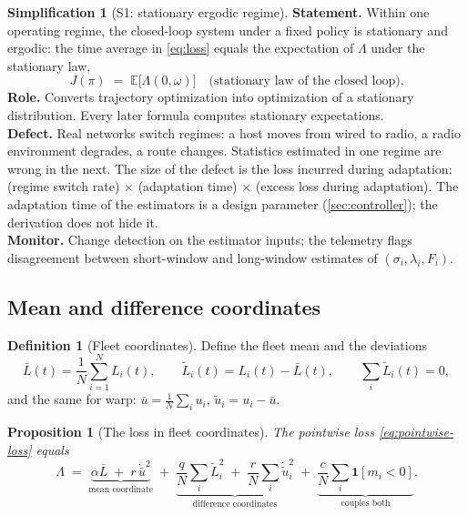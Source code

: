 \documentclass[11pt, a4paper]{article}
\theoremstyle{definition}
\newtheorem{definition}{Definition}[section]
\newtheorem{simplification}{Simplification}
\theoremstyle{plain}
\newtheorem{proposition}[theorem]{Proposition}
\theoremstyle{remark}
\newcommand{\E}{\mathbb{E}}
\newcommand{\ind}[1]{\mathbf{1}\!\left[#1\right]}
\newcommand{\Lbar}{\bar{L}}
\newcommand{\Ltil}[1]{\tilde{L}_{#1}}
\begin{document}
\begin{simplification}[S1: stationary ergodic regime]\label{simp:ergodic}
\textbf{Statement.}  Within one operating regime, the closed-loop system
under a fixed policy is stationary and ergodic: the time average in
\cref{eq:loss} equals the expectation of $\Lambda$ under the stationary law,
\[
  J(\pi) \;=\; \E\bigl[\Lambda(0,\omega)\bigr]
  \quad\text{(stationary law of the closed loop).}
\]
\textbf{Role.}  Converts trajectory optimization into optimization of a
stationary distribution.  Every later formula computes stationary
expectations.\\
\textbf{Defect.}  Real networks switch regimes: a host moves from wired
to radio, a radio environment degrades, a route changes.  Statistics
estimated in one regime are wrong in the next.  The size of the defect is
the loss incurred during adaptation: (regime switch rate) $\times$
(adaptation time) $\times$ (excess loss during adaptation).  The
adaptation time of the estimators is a design parameter
(\cref{sec:controller}); the derivation does not hide it.\\
\textbf{Monitor.}  Change detection on the estimator inputs; the
telemetry flags disagreement between short-window and long-window
estimates of $(\sigma_i, \lambda_i, F_i)$.
\end{simplification}

\subsection{Mean and difference coordinates}\label{sec:coordinates}

\begin{definition}[Fleet coordinates]\label{def:coordinates}
Define the fleet mean and the deviations
\[
  \Lbar(t) = \frac1N\sum_{i=1}^N L_i(t),
  \qquad
  \Ltil{i}(t) = L_i(t) - \Lbar(t),
  \qquad
  \textstyle\sum_i \Ltil{i}(t) = 0 ,
\]
and the same for warp: $\bar u = \frac1N\sum_i u_i$,
$\tilde u_i = u_i - \bar u$.
\end{definition}

\begin{proposition}[The loss in fleet coordinates]\label{prop:loss-coords}
The pointwise loss \cref{eq:pointwise-loss} equals
\begin{equation}\label{eq:loss-coords}
  \Lambda
  \;=\;
  \underbrace{\alpha \Lbar \;+\; r\,\dot{\bar u}^2}_{\text{mean
  coordinate}}
  \;+\;
  \underbrace{\frac{q}{N}\sum_i \Ltil{i}^2
  \;+\; \frac{r}{N}\sum_i \dot{\tilde u}_i^2}_{\text{difference
  coordinates}}
  \;+\;
  \underbrace{\frac{c}{N}\sum_i \ind{m_i < 0}}_{\text{couples both}} .
\end{equation}
\end{proposition}
\end{document}
